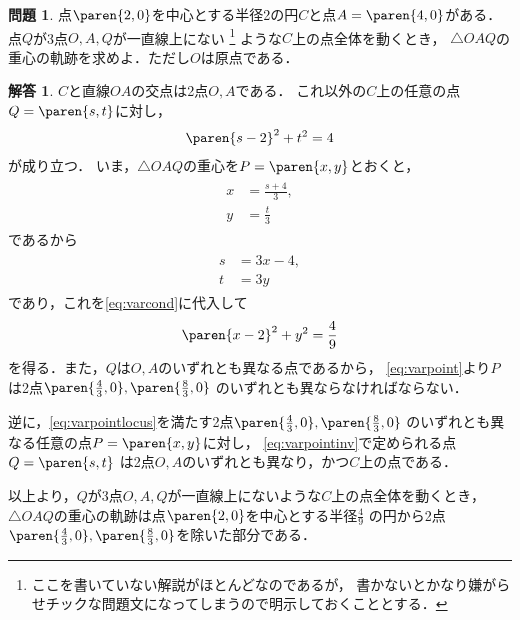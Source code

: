 \documentclass[11pt,a4paper]{ltjsarticle}
\newcommand*{\coord}[1]{\paren{#1}}
\theoremstyle{definition}
\newtheorem{que}[dfn]{問題}
\newtheorem{ans}[dfn]{解答}
\begin{document}
\begin{que} \label{que:varpoint}
  点$\coord{2,0}$を中心とする半径2の円$C$と点$A = \coord{4,0}$がある．
  点$Q$が3点$O, A, Q$が一直線上にない
  \footnote{%
    ここを書いていない解説がほとんどなのであるが，
    書かないとかなり嫌がらせチックな問題文になってしまうので明示しておくこととする．
  }%
  ような$C$上の点全体を動くとき，
  $\triangle OAQ$の重心の軌跡を求めよ．ただし$O$は原点である．
\end{que}

\begin{ans} \label{ans:varpoint}
  $C$と直線$OA$の交点は2点$O, A$である．
  これ以外の$C$上の任意の点$Q = \coord{s, t}$に対し，
  \begin{align}
    \paren{s - 2}^2 + t^2 = 4
    \label{eq:varcond}
  \end{align}
  が成り立つ．
  いま，$\triangle OAQ$の重心を$P = \coord{x, y}$とおくと，
  \begin{align}
    \begin{aligned}
      x & = \frac{s + 4}{3}, \\
      y & = \frac{t}{3}
    \end{aligned}
    \label{eq:varpoint}
  \end{align}
  であるから
  \begin{align}
    \begin{aligned}
      s & = 3x - 4, \\
      t & = 3y
    \end{aligned}
    \label{eq:varpointinv}
  \end{align}
  であり，これを\cref{eq:varcond}に代入して
  \begin{align}
    \paren{x - 2}^2 + y^2 = \frac{4}{9}
    \label{eq:varpointlocus}
  \end{align}
  を得る．また，$Q$は$O,A$のいずれとも異なる点であるから，
  \cref{eq:varpoint}より$P$は2点$\coord{\frac{4}{3}, 0}, \coord{\frac{8}{3}, 0}$
  のいずれとも異ならなければならない．

  逆に，\cref{eq:varpointlocus}を満たす2点$\coord{\frac{4}{3}, 0}, \coord{\frac{8}{3}, 0}$
  のいずれとも異なる任意の点$P = \coord{x,y}$に対し，
  \cref{eq:varpointinv}で定められる点$Q = \coord{s, t}$
  は2点$O, A$のいずれとも異なり，かつ$C$上の点である．
  
  以上より，$Q$が3点$O,A,Q$が一直線上にないような$C$上の点全体を動くとき，
  $\triangle OAQ$の重心の軌跡は点$\coord{2, 0}$を中心とする半径$\frac{4}{9}$
  の円から2点$\coord{\frac{4}{3}, 0}, \coord{\frac{8}{3}, 0}$を除いた部分である．
\end{ans}
\end{document}
